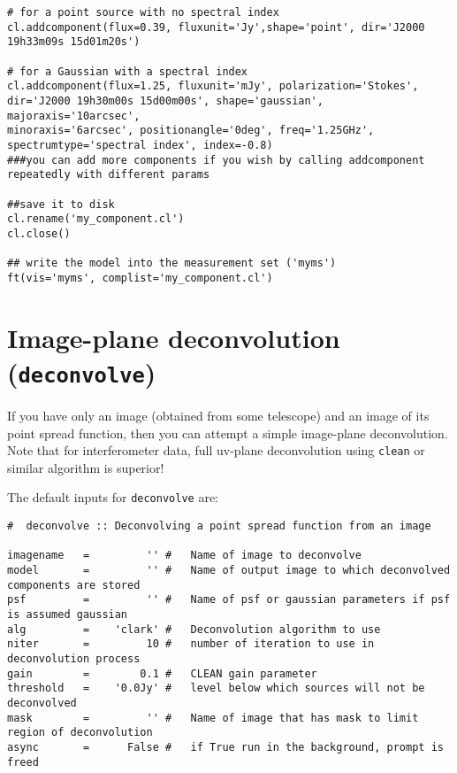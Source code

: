 \small
\begin{verbatim}
# for a point source with no spectral index
cl.addcomponent(flux=0.39, fluxunit='Jy',shape='point', dir='J2000 19h33m09s 15d01m20s')
 
# for a Gaussian with a spectral index
cl.addcomponent(flux=1.25, fluxunit='mJy', polarization='Stokes',
dir='J2000 19h30m00s 15d00m00s', shape='gaussian', majoraxis='10arcsec',
minoraxis='6arcsec', positionangle='0deg', freq='1.25GHz',
spectrumtype='spectral index', index=-0.8)
###you can add more components if you wish by calling addcomponent repeatedly with different params
 
##save it to disk
cl.rename('my_component.cl')
cl.close()
 
## write the model into the measurement set ('myms')
ft(vis='myms', complist='my_component.cl')
\end{verbatim}


\section{Image-plane deconvolution ({\tt deconvolve})}
\label{section:im.deconvolve}

If you have only an image (obtained from some telescope) and an image
of its point spread function, then you can attempt a simple image-plane
deconvolution.  Note that for interferometer data, full uv-plane 
deconvolution using {\tt clean} or similar algorithm is superior!

The default inputs for {\tt deconvolve} are:
\small
\begin{verbatim}
#  deconvolve :: Deconvolving a point spread function from an image

imagename   =         '' #   Name of image to deconvolve
model       =         '' #   Name of output image to which deconvolved components are stored
psf         =         '' #   Name of psf or gaussian parameters if psf is assumed gaussian
alg         =    'clark' #   Deconvolution algorithm to use
niter       =         10 #   number of iteration to use in deconvolution process
gain        =        0.1 #   CLEAN gain parameter 
threshold   =    '0.0Jy' #   level below which sources will not be deconvolved
mask        =         '' #   Name of image that has mask to limit region of deconvolution
async       =      False #   if True run in the background, prompt is freed

\end{verbatim}
\normalsize

